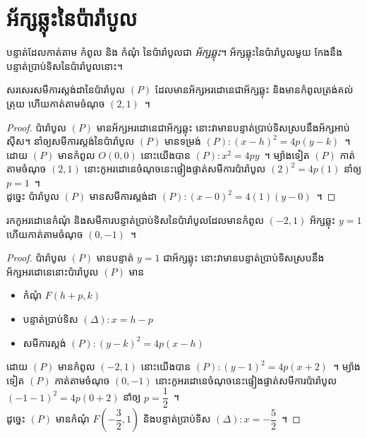 \section{អ័ក្សឆ្លុះនៃប៉ារ៉ាបូល}
\begin{generality}
	បន្ទាត់ដែលកាត់តាម កំពូល និង កំណុំ នៃប៉ារ៉ាបូលជា \emph{អ័ក្សឆ្លុះ}។ អ័ក្សឆ្លុះនៃប៉ារ៉ាបូលមួយ កែងនឹងបន្ទាត់ប្រាប់ទិសនៃប៉ារ៉ាបូលនោះ។
\end{generality}
%
\begin{example}
	សរសេរសមីការស្តង់ដានៃប៉ារ៉ាបូល $ (P) $ ដែលមានអ័ក្សអរដោនេជាអ័ក្សឆ្លុះ និងមានកំពូលត្រង់គល់ត្រុយ ហើយកាត់តាមចំណុច $ (2,1) $~។
\end{example}
%
\begin{proof}
	ប៉ារ៉ាបូល $ (P) $ មានអ័ក្សអរដោនេជាអ័ក្សឆ្លុះ នោះវាមានបន្ទាត់ប្រាប់ទិសស្របនឹងអ័ក្សអាប់ស៊ីស។ នាំឲ្យសមីការស្តង់នៃប៉ារ៉ាបូល $ (P) $ មានទម្រង់ $ (P):(x-h)^2=4p(y-k) $~។ ដោយ $ (P) $ មានកំពូល $ O(0,0) $ នោះយើងបាន $ (P):x^2=4py $~។ ម្យ៉ាងទៀត $ (P) $ កាត់តាមចំណុច $ (2,1) $ នោះកូអរដោនេចំណុចនេះផ្ទៀងផ្ទាត់សមីការប៉ារ៉ាបូល $ (2)^2=4p(1) $ នាំឲ្យ $ p=1 $~។\\
	ដូច្នេះ ប៉ារ៉ាបូល $ (P) $ មានសមីការស្តង់ដា $ (P):(x-0)^2=4(1)(y-0) $~។
\end{proof}
%
\begin{example}
	រកកូអរដោនេកំណុំ និងសមីការបន្ទាត់ប្រាប់ទិសនៃប៉ារ៉ាបូលដែលមានកំពូល $ (-2,1) $ អ័ក្សឆ្លុះ $ y=1 $ ហើយកាត់តាមចំណុច $ (0,-1) $~។
\end{example}
%
\begin{proof}
	ប៉ារ៉ាបូល $ (P) $ មានបន្ទាត់ $ y=1 $ ជាអ័ក្សឆ្លុះ នោះវាមានបន្ទាត់ប្រាប់ទិសស្របនឹងអ័ក្សអរដោនេនោះប៉ារ៉ាបូល $ (P) $ មាន
	\begin{itemize}
		\item កំណុំ $ F(h+p,k) $
		\item បន្ទាត់ប្រាប់ទិស $ (\Delta):x=h-p $
		\item សមីការស្តង់ $ (P):(y-k)^2=4p(x-h) $
	\end{itemize}
	ដោយ $ (P) $ មានកំពូល $ (-2,1) $ នោះយើងបាន $ (P):(y-1)^2=4p(x+2) $~។ ម្យ៉ាងទៀត $ (P) $ កាត់តាមចំណុច $ (0,-1) $ នោះកូអរដោនេចំណុចនេះផ្ទៀងផ្ទាត់សមីការប៉ារ៉ាបូល $ (-1-1)^2=4p(0+2) $ នាំឲ្យ $ p=\dfrac{1}{2} $~។\\
	ដូច្នេះ $ (P) $ មានកំណុំ $ F\left(-\dfrac{3}{2},1\right) $ និងបន្ទាត់ប្រាប់ទិស $ (\Delta):x=-\dfrac{5}{2} $~។
\end{proof}
%
